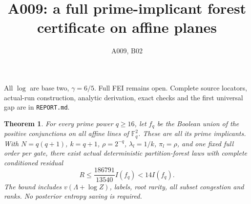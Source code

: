 \documentclass[11pt]{article}
\newtheorem{theorem}{Theorem}
\begin{document}
\title{A009: a full prime-implicant forest certificate on affine planes}
\author{A009, B02}\maketitle
All $\log$ are base two, $\gamma=6/5$. Full FEI remains open.
Complete source locators, actual-run construction, analytic derivation,
exact checks and the first universal gap are in \texttt{REPORT.md}.

\begin{theorem}
For every prime power $q\ge16$, let $f_q$ be the Boolean union of the
positive conjunctions on all affine lines of $\mathbb F_q^2$.
These are all its prime implicants. With $N=q(q+1)$, $k=q+1$,
$\rho=2^{-q}$, $\lambda_l=1/k$, $\pi_l=\rho$, and one fixed full order
per gate, there exist actual deterministic partition-forest laws with
complete conditioned residual
\[
 R\le\frac{186791}{13540}I(f_q)<14I(f_q).
\]
The bound includes $v(\Lambda+\log Z)$, labels, root rarity, all subset
congestion and ranks. No posterior entropy saving is required.
\end{theorem}
\end{document}
